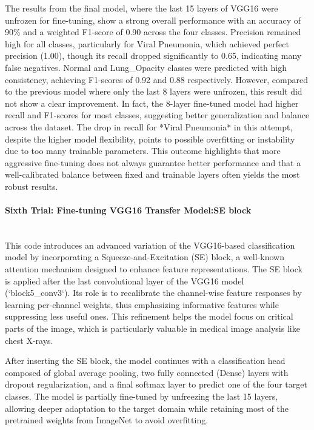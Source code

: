 \documentclass{article}
\begin{document}
The results from the final model, where the last 15 layers of VGG16 were unfrozen for fine-tuning, show a strong overall performance with an accuracy of 90\% and a weighted F1-score of 0.90 across the four classes. Precision remained high for all classes, particularly for Viral Pneumonia, which achieved perfect precision (1.00), though its recall dropped significantly to 0.65, indicating many false negatives. Normal and Lung\_Opacity classes were predicted with high consistency, achieving F1-scores of 0.92 and 0.88 respectively. 
However, compared to the previous model where only the last 8 layers were unfrozen, this result did not show a clear improvement. In fact, the 8-layer fine-tuned model had higher recall and F1-scores for most classes, suggesting better generalization and balance across the dataset. The drop in recall for *Viral Pneumonia* in this attempt, despite the higher model flexibility, points to possible overfitting or instability due to too many trainable parameters. This outcome highlights that more aggressive fine-tuning does not always guarantee better performance and that a well-calibrated balance between fixed and trainable layers often yields the most robust results.

\paragraph{Sixth Trial: Fine-tuning VGG16 Transfer Model:SE block}\mbox{}\\

This code introduces an advanced variation of the VGG16-based classification model by incorporating a Squeeze-and-Excitation (SE) block, a well-known attention mechanism designed to enhance feature representations. The SE block is applied after the last convolutional layer of the VGG16 model (`block5\_conv3`). Its role is to recalibrate the channel-wise feature responses by learning per-channel weights, thus emphasizing informative features while suppressing less useful ones. This refinement helps the model focus on critical parts of the image, which is particularly valuable in medical image analysis like chest X-rays.

After inserting the SE block, the model continues with a classification head composed of global average pooling, two fully connected (Dense) layers with dropout regularization, and a final softmax layer to predict one of the four target classes. The model is partially fine-tuned by unfreezing the last 15 layers, allowing deeper adaptation to the target domain while retaining most of the pretrained weights from ImageNet to avoid overfitting.
\end{document}

